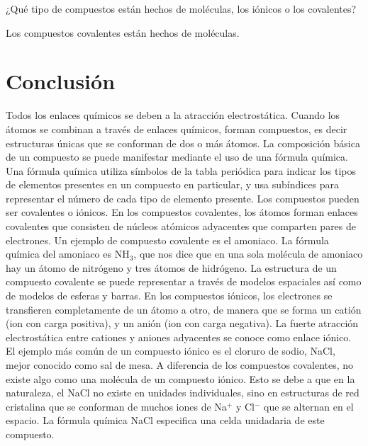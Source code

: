 ¿Qué tipo de compuestos están hechos de moléculas, los iónicos o los covalentes?

\begin{solutionbox}{1.2cm}
    Los compuestos covalentes están hechos de moléculas.
\end{solutionbox}

\section{Conclusión}
Todos los enlaces químicos se deben a la atracción electrostática. Cuando los átomos se combinan a través de enlaces químicos, forman compuestos, es decir estructuras únicas que se conforman de dos o más átomos. La composición básica de un compuesto se puede manifestar mediante el uso de una fórmula química. Una fórmula química utiliza símbolos de la tabla periódica para indicar los tipos de elementos presentes en un compuesto en particular, y usa subíndices para representar el número de cada tipo de elemento presente.
Los compuestos pueden ser covalentes o iónicos. En los compuestos covalentes, los átomos forman enlaces covalentes que consisten de núcleos atómicos adyacentes que comparten pares de electrones. Un ejemplo de compuesto covalente es el amoniaco. La fórmula química del amoniaco es NH$_3$, que nos dice que en una sola molécula de amoniaco hay un átomo de nitrógeno y tres átomos de hidrógeno. La estructura de un compuesto covalente se puede representar a través de modelos espaciales así como de modelos de esferas y barras.
En los compuestos iónicos, los electrones se transfieren completamente de un átomo a otro, de manera que se forma un catión (ion con carga positiva), y un anión (ion con carga negativa). La fuerte atracción electrostática entre cationes y aniones adyacentes se conoce como enlace iónico. El ejemplo más común de un compuesto iónico es el cloruro de sodio, NaCl, mejor conocido como sal de mesa. A diferencia de los compuestos covalentes, no existe algo como una molécula de un compuesto iónico. Esto se debe a que en la naturaleza, el NaCl no existe en unidades individuales, sino en estructuras de red cristalina que se conforman de muchos iones de Na$^+$ y Cl$^-$ que se alternan en el espacio. La fórmula química NaCl especifica una celda unidadaria de este compuesto.